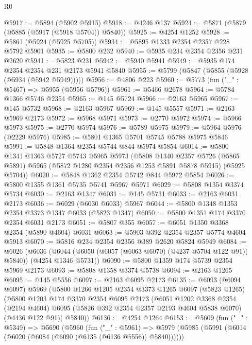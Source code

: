 \begin{lexlean}{R0}
\begin{coremodule}
@5917 := @5894 (@5902 @5915)
@5918 := @4246 @137
@5924 := @5871 (@5879 (@5885 (@5917 (@5918 @5704)) @5840))
@5925 := @4254 @1252
@5928 := @5861 (@5924 (@5925 @5705))
@5934 := @5895 @1333 @2354 @2357 @228 @5792 @5901
@5935 := @5800 @232
@5940 := @5935 @234 @2354 @2356 @231 @2620
@5941 := @5823 @231
@5942 := @5940 @5941
@5949 := @5935 @174 @2354 @2354 @231 @2173 @5941 @5840
@5955 := @5799 (@5847 (@5855 (@5928 (@5934 (@5942 @5949)))))
@5956 := @4806 @223
@5960 := @5773 (fun ("_" : @5467) => @5955 (@5956 @5796))
@5961 := @5466 @2678
@5964 := @5784 @1366 @5746 @2354
@5965 := @145 @5724
@5966 := @2163 @5965
@5967 := @145 @5732
@5968 := @2163 @5967
@5969 := @145 @5557
@5971 := @2163 @5969 @2173
@5972 := @5968 @5971
@5973 := @2770 @5972
@5974 := @5966 @5973
@5975 := @2770 @5974
@5976 := @5789 @5975
@5979 := @5964 @5976 (@2229 @5976)
@5985 := @5801 @1365 @5701 @5745 @5788 @5975 @5846
@5991 := @5848 @1364 @2354 @5744 @844 @5974 @5854
@6014 := @5800
    @1341
    @1363
    @5727
    @5743
    @5965
    @5973
    (@5808
      @1340
      @2357
      @5726
      (@5865 @5891)
      @5965
      (@5872 @1280 @2354 @2356 @1253 @5891 @5878 @5915)
      (@5925 @5704))
@6020 := @5848 @1362 @2354 @5742 @844 @5972 @5854
@6026 := @5800 @1355 @1361 @5735 @5741 @5967 @5971
@6029 := @5808 @1354 @3374 @5734
@6030 := @2163 @1347
@6031 := @145 @5731
@6033 := @2163 @6031 @2173
@6036 := @6029 (@6030 @6033) @5967
@6044 := @5800 @1348 @1353 @2354 @3373 @1347 @6033 (@5823 @1347)
@6050 := @5800 @1351 @174 @3370 @2354 @6031 @2173
@6051 := @5807 @355
@6057 := @6051 @1350 @3368 @2354 (@5890 @4604) @6031
@6063 := @5903 @392 @2354 @2357 @5774 @4604 @5913
@6070 := @5816 @234 @2354 @2356 @389 @2620 @5824 @5949
@6084 := @6026
    (@6036 (@6044 (@6050 (@6057 (@6063 @6070) (@4237 @5704 @122 @91)) @5840)) (@4254 @1346 @5731))
@6090 := @5800 @1359 @174 @5739 @2354 @5969 @2173
@6093 := @5808 @1358 @3374 @5738
@6094 := @2163 @1265
@6095 := @145 @5556
@6097 := @2163 @6095 @2173
@6135 := @6093
    (@6094 @6097)
    @5969
    (@5800
      @1266
      @1205
      @2354
      @3373
      @1265
      @6097
      (@5823 @1265)
      (@5800
        @1203
        @174
        @3370
        @2354
        @6095
        @2173
        (@6051
          @1202
          @3368
          @2354
          (@2194 @4604)
          @6095
          (@5826 @392 @2354 @2357 @2193 @4604 @5838 @6070)
          (@4436 @122 @91))
        @5840))
@6136 := @4254 @1264
@6153 := @5609
    (fun ("_" : @5349) =>
    @5690
      (@5960
        (fun ("_" : @5961) =>
        @5979
          (@5985 (@5991 (@6014 (@6020 (@6084 (@6090 (@6135 (@6136 @5556)) @5840))))))

\end{coremodule}
\end{lexlean}

